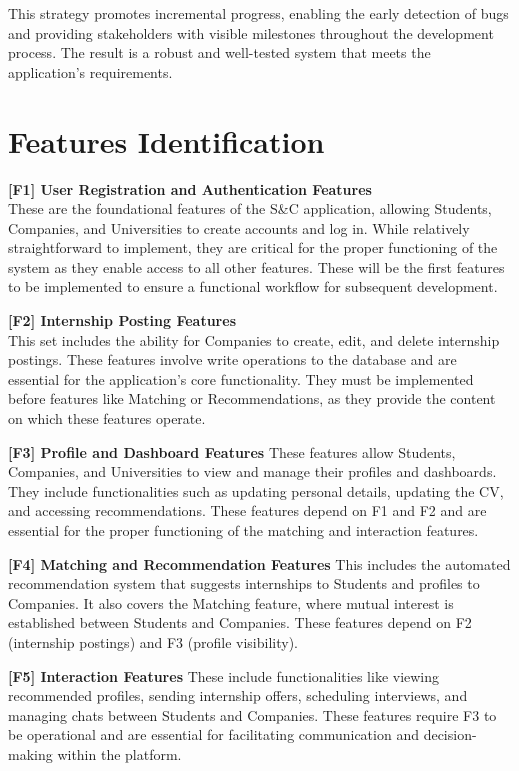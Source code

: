 \documentclass{Configuration_Files/PoliMi3i_thesis}
\begin{document}
This strategy promotes incremental progress, enabling the early detection of bugs and providing stakeholders with visible milestones throughout the development process. The result is a robust and well-tested system that meets the application's requirements.

     \section{Features Identification}
     
\textbf{[F1] User Registration and Authentication Features}\\
These are the foundational features of the S\&C application, allowing Students, Companies, and Universities to create accounts and log in. While relatively straightforward to implement, they are critical for the proper functioning of the system as they enable access to all other features. These will be the first features to be implemented to ensure a functional workflow for subsequent development.

\textbf{[F2] Internship Posting Features} \\
This set includes the ability for Companies to create, edit, and delete internship postings. These features involve write operations to the database and are essential for the application’s core functionality. They must be implemented before features like Matching or Recommendations, as they provide the content on which these features operate.

\textbf{[F3] Profile and Dashboard Features}  
These features allow Students, Companies, and Universities to view and manage their profiles and dashboards. They include functionalities such as updating personal details, updating the CV,  and accessing recommendations. These features depend on F1 and F2 and are essential for the proper functioning of the matching and interaction features.

\textbf{[F4] Matching and Recommendation Features}  
This includes the automated recommendation system that suggests internships to Students and profiles to Companies. It also covers the Matching feature, where mutual interest is established between Students and Companies. These features depend on F2 (internship postings) and F3 (profile visibility).

\textbf{[F5] Interaction Features}  
These include functionalities like viewing recommended profiles, sending internship offers, scheduling interviews, and managing chats between Students and Companies. These features require F3 to be operational and are essential for facilitating communication and decision-making within the platform.
\end{document}
